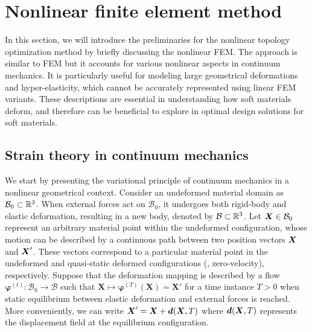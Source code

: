 \section{Nonlinear finite element method} \label{sec:C1:fem}
In this section, we will introduce the preliminaries for the nonlinear topology optimization method by briefly discussing the nonlinear FEM. The approach is similar to FEM but it accounts for various nonlinear aspects in continuum mechanics. It is particularly useful for modeling large geometrical deformations and hyper-elasticity, which cannot be accurately represented using linear FEM variants. These descriptions are essential in understanding how soft materials deform, and therefore can be beneficial to explore in optimal design solutions for soft materials.

\subsection{Strain theory in continuum mechanics}
We start by presenting the variational principle of continuum mechanics in a nonlinear geometrical context. Consider an undeformed material domain as $\mathcal{B}_0 \subset \mathbb{R}^3$. When external forces act on $\mathcal{B}_0$, it undergoes both rigid-body and elastic deformation, resulting in a new body, denoted by $\mathcal{B} \subset \mathbb{R}^3$. Let ${\boldsymbol{X}} \in \mathcal{B}_0$ represent an arbitrary material point within the undeformed configuration, whose motion can be described by a continuous path between two position vectors ${\boldsymbol{X}}$ and ${\boldsymbol{X}}'$. These vectors correspond to a particular material point in the undeformed and quasi-static deformed configurations (\ie, zero-velocity), respectively. Suppose that the deformation mapping is described by a flow $\boldsymbol{\varphi}^{(t)}: \mathcal{B}_0 \to \mathcal{B}$ such that $\boldsymbol{X} \mapsto \boldsymbol{\varphi}^{(T)}(\boldsymbol{X}) = \boldsymbol{X}'$ for a time instance $T > 0$ when static equilibrium between elastic deformation and external forces is reached. More conveniently, we can write $\boldsymbol{X}' = \boldsymbol{X} + {\boldsymbol{d}}(\boldsymbol{X},T)$ where ${\boldsymbol{d}}({\boldsymbol{X}},T)$ represents the displacement field at the equilibrium configuration.

